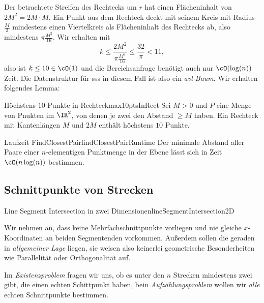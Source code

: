 \documentclass[language=ngerman,algolist,acrolist]{TemplateLecture}
\begin{document}
Der betrachtete Streifen des Rechtecks um $r$ hat einen Flächeninhalt von $2M^2 = 2M \cdot M$. Ein Punkt aus dem Rechteck deckt mit seinem Kreis mit Radius $\frac{M}{2}$ mindestens einen Viertelkreis als Flächeninhalt des Rechtecks ab, also mindestens $\pi\frac{M^2}{16}$. Wir erhalten mit
\begin{equation*}
    k \leq \frac{2M^2}{\pi\frac{M^2}{16}} \leq \frac{32}{\pi} < 11,
\end{equation*}
also ist $k \leq 10\in \cO(1)$ und die Bereichsanfrage benötigt auch nur $\cO(\log(n))$ Zeit. Die Datenstruktur für \ac{sss} in diesem Fall ist also ein \emph{\ac{avl}-Baum}. Wir erhalten folgendes Lemma:

\begin{lem}{Höchstens $10$ Punkte in Rechteck}{max10ptsInRect}
    Sei $M > 0$ und $P$ eine Menge von Pnukten im $\IR^2$, von denen je zwei den Abstand $\geq M$ haben. Ein Rechteck mit Kantenlängen $M$ und $2M$ enthält höchstens $10$ Punkte.
\end{lem}

\begin{thm}{Laufzeit FindClosestPair}{findClosestPairRuntime}
    Der minimale Abstand aller Paare einer $n$-elementigen Punktmenge in der Ebene lässt sich in Zeit $\cO(n \log(n))$ bestimmen.
\end{thm}

\subsection{Schnittpunkte von Strecken}

\begin{prob}{Line Segment Intersection in zwei Dimensionen}{lineSegmentIntersection2D}
\end{prob}
Wir nehmen an, dass keine Mehrfachschnittpunkte vorliegen und nie gleiche $x$-Koordinaten an beiden Segmentenden vorkommen. Außerdem sollen die geraden in \emph{allgemeiner Lage} liegen, sie weisen also keinerlei geometrische Besonderheiten wie Parallelität oder Orthogonalität auf.

Im \emph{Existenzproblem} fragen wir uns, ob es unter den $n$ Strecken mindestens zwei gibt, die einen echten Schittpunkt haben, bein \emph{Aufzählungsproblem} wollen wir \emph{alle} echten Schnittpunkte bestimmen.
\end{document}
